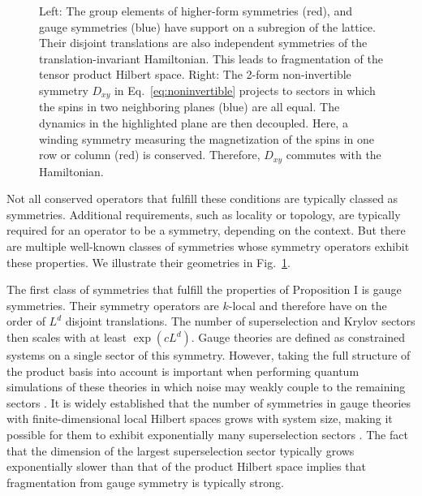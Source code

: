 \documentclass[
 reprint,
 amsmath,amssymb,
 aps,floatfix,prl,superscriptaddress
]{revtex4-2}
\begin{document}
\begin{figure}
{
        }
    
    \caption{Left: The group elements of higher-form symmetries (red), and gauge symmetries (blue) have support on a subregion of the lattice. Their disjoint translations are also independent symmetries of the translation-invariant Hamiltonian. This leads to fragmentation of the tensor product Hilbert space. Right: The 2-form non-invertible symmetry $D_{xy}$ in Eq.~\eqref{eq:noninvertible} projects to sectors in which the spins in two neighboring planes (blue) are all equal. The dynamics in the highlighted plane are then decoupled. Here, a winding symmetry measuring the magnetization of the spins in one row or column (red) is conserved. Therefore, $D_{xy}$ commutes with the Hamiltonian.}
    \label{fig:fragFromSym}
\end{figure}

Not all conserved operators that fulfill these conditions are typically classed as symmetries. Additional requirements, such as locality or topology, are typically required for an operator to be a symmetry, depending on the context. But there are multiple well-known classes of symmetries whose symmetry operators exhibit these properties. We illustrate their geometries in Fig.~\ref{fig:fragFromSym}. 

The first class of symmetries that fulfill the properties of Proposition I is gauge symmetries. Their symmetry operators are $k$-local and therefore have on the order of $L^d$ disjoint translations. The number of superselection and Krylov sectors then scales with at least $\exp(c L^d)$. 
Gauge theories are defined as constrained systems on a single sector of this symmetry. However, taking the full structure of the product basis into account is important when performing quantum simulations of these theories in which noise may weakly couple to the remaining sectors \cite{Halimeh:2025vvp}. It is widely established that the number of symmetries in gauge theories with finite-dimensional local Hilbert spaces grows with system size, making it possible for them to exhibit exponentially many superselection sectors \cite{Ciavarella:2025zqf,Steinegger2025}.
The fact that the dimension of the largest superselection sector typically grows exponentially slower than that of the product Hilbert space \cite{Desaules:2022kse,Luo:2020stn,Mariani:2023eix} implies that fragmentation from gauge symmetry is typically strong.
\end{document}
